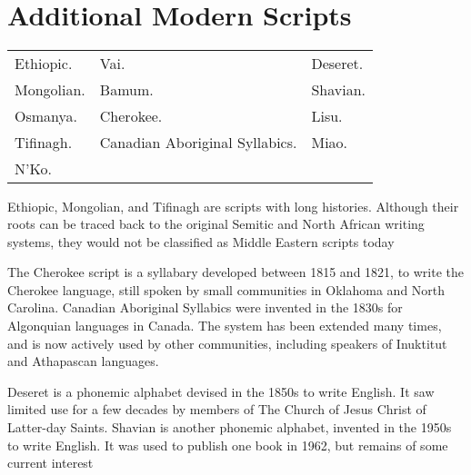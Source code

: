 






^^A
^^A
^^A
^^A
^^A
^^A
^^A
^^A

^^A
^^A

^^A
^^A

^^A
^^A
^^A
^^A
^^A
^^A
^^A
^^A
^^A
^^A
^^A

\section{Additional Modern Scripts}

\begin{center}
\begin{tabular}{lp{5cm}l}
Ethiopic. &Vai. &Deseret.\\
Mongolian. &Bamum. &Shavian.\\
Osmanya.   &Cherokee. &Lisu.\\
Tifinagh.  &Canadian Aboriginal Syllabics. &Miao.\\
N’Ko.&&\\
\end{tabular}
\end{center}

Ethiopic, Mongolian, and Tifinagh are scripts with long histories. Although their roots can
be traced back to the original Semitic and North African writing systems, they would not
be classified as Middle Eastern scripts today

The Cherokee script is a syllabary developed between 1815 and 1821, to write the Cherokee
language, still spoken by small communities in Oklahoma and North Carolina. Canadian
Aboriginal Syllabics were invented in the 1830s for Algonquian languages in Canada. The
system has been extended many times, and is now actively used by other communities, including speakers of Inuktitut and Athapascan languages.

Deseret is a phonemic alphabet devised in the 1850s to write English. It saw limited use for
a few decades by members of The Church of Jesus Christ of Latter-day Saints. Shavian is
another phonemic alphabet, invented in the 1950s to write English. It was used to publish
one book in 1962, but remains of some current interest



